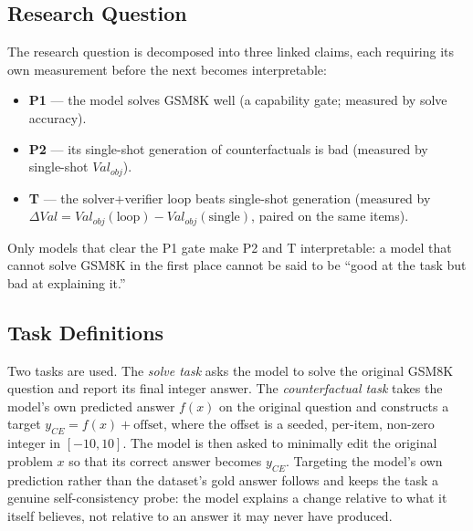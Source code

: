 \documentclass[twoside,twocolumn,10pt]{article}
\begin{document}
\subsection{Research Question}
The research question is decomposed into three linked claims, each requiring its own measurement before the next becomes interpretable:
\begin{itemize}
\item \textbf{P1} --- the model solves GSM8K well (a capability gate; measured by solve accuracy).
\item \textbf{P2} --- its single-shot generation of counterfactuals is bad (measured by single-shot $Val_{obj}$).
\item \textbf{T} --- the solver+verifier loop beats single-shot generation (measured by $\Delta Val = Val_{obj}(\text{loop}) - Val_{obj}(\text{single})$, paired on the same items).
\end{itemize}
Only models that clear the P1 gate make P2 and T interpretable: a model that cannot solve GSM8K in the first place cannot be said to be ``good at the task but bad at explaining it.''

\subsection{Task Definitions}
Two tasks are used. The \textit{solve task} asks the model to solve the original GSM8K question and report its final integer answer. The \textit{counterfactual task} takes the model's own predicted answer $f(x)$ on the original question and constructs a target $y_{CE} = f(x) + \text{offset}$, where the offset is a seeded, per-item, non-zero integer in $[-10, 10]$. The model is then asked to minimally edit the original problem $x$ so that its correct answer becomes $y_{CE}$. Targeting the model's own prediction rather than the dataset's gold answer follows \textcite{dehghanighobadi2025llmsexplaincounterfactually} and keeps the task a genuine self-consistency probe: the model explains a change relative to what it itself believes, not relative to an answer it may never have produced.
\end{document}
